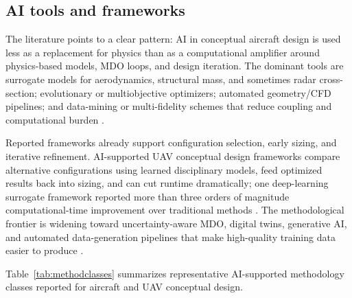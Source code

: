 \subsection{AI tools and frameworks}

The literature points to a clear pattern: AI in conceptual aircraft
design is used less as a replacement for physics than as a
computational amplifier around physics-based models, MDO loops, and
design iteration. The dominant tools are surrogate models for
aerodynamics, structural mass, and sometimes radar cross-section;
evolutionary or multiobjective optimizers; automated geometry/CFD
pipelines; and data-mining or multi-fidelity schemes that reduce
coupling and computational burden
\citep{karali2024surrogate,leng2024,pliakos2025}.

Reported frameworks already support configuration selection, early
sizing, and iterative refinement. AI-supported UAV conceptual design
frameworks compare alternative configurations using learned
disciplinary models, feed optimized results back into sizing, and can
cut runtime dramatically; one deep-learning surrogate framework
reported more than three orders of magnitude computational-time
improvement over traditional methods \citep{karali2024surrogate}. The
methodological frontier is widening toward uncertainty-aware MDO,
digital twins, generative AI, and automated data-generation pipelines
that make high-quality training data easier to produce
\citep{karali2024surrogate,wang2023,du2026,pliakos2025}.

Table~\ref{tab:methodclasses} summarizes representative AI-supported
methodology classes reported for aircraft and UAV conceptual design.

